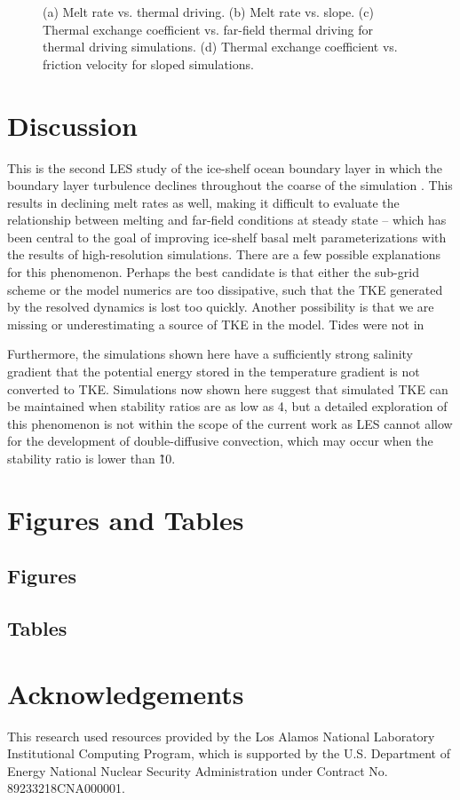 \documentclass[draft]{styles/agujournal2019}
\begin{document}
\begin{figure}
\begin{minipage}{0.5\textwidth}
    \end{minipage}
    \caption{(a) Melt rate vs. thermal driving. (b) Melt rate vs. slope. (c) Thermal exchange coefficient vs. far-field thermal driving for thermal driving simulations. (d) Thermal exchange coefficient vs. friction velocity for sloped simulations.}
    \label{fig:melt_sensitivity}
\end{figure}


\section{Discussion}

This is the second LES study of the ice-shelf ocean boundary layer in which the boundary layer turbulence declines throughout the coarse of the simulation \cite{XX}. This results in declining melt rates as well, making it difficult to evaluate the relationship between melting and far-field conditions at steady state -- which has been central to the goal of improving ice-shelf basal melt parameterizations with the results of high-resolution simulations.
There are a few possible explanations for this phenomenon. Perhaps the best candidate is that either the sub-grid scheme or the model numerics are too dissipative, such that the TKE generated by the resolved dynamics is lost too quickly. Another possibility is that we are missing or underestimating a source of TKE in the model. Tides were not in

Furthermore, the simulations shown here have a sufficiently strong salinity gradient that the potential energy stored in the temperature gradient is not converted to TKE. Simulations now shown here suggest that simulated TKE can be maintained when stability ratios are as low as 4, but a detailed exploration of this phenomenon is not within the scope of the current work as LES cannot allow for the development of double-diffusive convection, which may occur when the stability ratio is lower than \~ 10.  

\section{Figures and Tables}

\subsection{Figures}

\subsection{Tables}


\section{Acknowledgements}

This research used resources provided by the Los Alamos National Laboratory Institutional Computing Program, which is supported by the U.S. Department of Energy National Nuclear Security Administration under Contract No. 89233218CNA000001.
\end{document}
